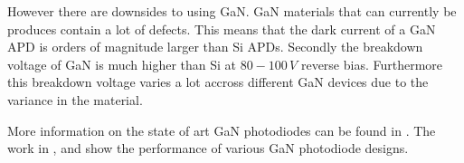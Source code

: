 However there are downsides to using GaN. GaN materials that can currently be produces contain a lot of defects. This means that the dark current of a GaN APD is orders of magnitude larger than Si APDs. Secondly the breakdown voltage of GaN is much higher than Si at $80-100\,V$ reverse bias. Furthermore this breakdown voltage varies a lot accross different GaN devices due to the variance in the material.

More information on the state of art GaN photodiodes can be found in \cite{nikzad2016single}. The work in \cite{choi2009geiger}, \cite{verghese2001gan} and \cite{carrano2000gan} show the performance of various GaN photodiode designs. 
